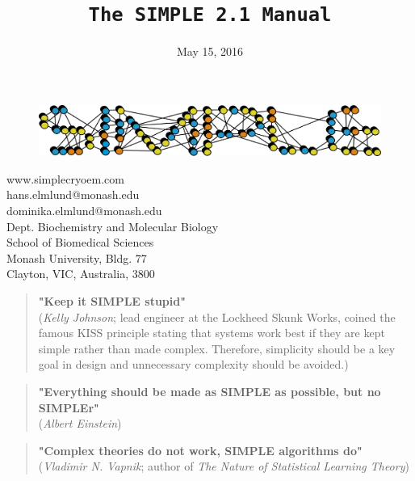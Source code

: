 \documentclass[a4paper,11pt]{article}
\newcommand{\prgname}[1]{\textcolor{NavyBlue}{\texttt{#1}}}
\begin{document}
\begin{figure}
\centering
\includegraphics[keepaspectratio=true,scale=0.6]{./SIMPLE_logo/rawlogo}
\end{figure}

\title{\prgname{The SIMPLE 2.1 Manual}}
\date{May 15, 2016}
\maketitle

\vspace{1em}
\begin{minipage}[ht]{0.48\textwidth}
www.simplecryoem.com\\
hans.elmlund@monash.edu\\
dominika.elmlund@monash.edu\\
Dept. Biochemistry and Molecular Biology\\
School of Biomedical Sciences\\
Monash University, Bldg. 77\\
Clayton, VIC, Australia, 3800\\
\end{minipage}
\vspace{20pt}

\begin{quote}
\textbf{"Keep it SIMPLE stupid"}\\(\textit{Kelly Johnson}; lead engineer at the Lockheed Skunk Works, coined the famous KISS principle stating that systems work best if they are kept simple rather than made complex. Therefore, simplicity should be a key goal in design and unnecessary complexity should be avoided.)
\end{quote}

\begin{quote}
\textbf{"Everything should be made as SIMPLE as possible, but no SIMPLEr"}\\(\textit{Albert Einstein})
\end{quote}

\begin{quote}
\textbf{"Complex theories do not work, SIMPLE algorithms do"}\\(\textit{Vladimir N. Vapnik}; author of \textit{The Nature of Statistical Learning Theory})
\end{quote}
\clearpage
\end{document}
